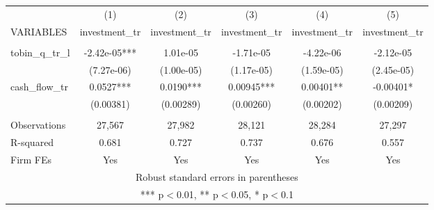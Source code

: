 \begin{tabular}{lccccc} \hline
 & (1) & (2) & (3) & (4) & (5) \\
VARIABLES & investment\_tr & investment\_tr & investment\_tr & investment\_tr & investment\_tr \\ \hline
 &  &  &  &  &  \\
tobin\_q\_tr\_l & -2.42e-05*** & 1.01e-05 & -1.71e-05 & -4.22e-06 & -2.12e-05 \\
 & (7.27e-06) & (1.00e-05) & (1.17e-05) & (1.59e-05) & (2.45e-05) \\
cash\_flow\_tr & 0.0527*** & 0.0190*** & 0.00945*** & 0.00401** & -0.00401* \\
 & (0.00381) & (0.00289) & (0.00260) & (0.00202) & (0.00209) \\
 &  &  &  &  &  \\
Observations & 27,567 & 27,982 & 28,121 & 28,284 & 27,297 \\
R-squared & 0.681 & 0.727 & 0.737 & 0.676 & 0.557 \\
 Firm FEs & Yes & Yes & Yes & Yes & Yes \\ \hline
\multicolumn{6}{c}{ Robust standard errors in parentheses} \\
\multicolumn{6}{c}{ *** p$<$0.01, ** p$<$0.05, * p$<$0.1} \\
\end{tabular}
